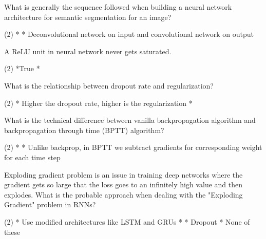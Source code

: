 \documentclass[10pt]{extarticle}
\begin{document}
\begin{exercise}
    What is generally the sequence followed when building a neural network architecture for semantic segmentation for an image?
    \begin{choice} (2)
        *
        * Deconvolutional network on input and convolutional network on output
    \end{choice}
\end{exercise}
\begin{solution}
\end{solution}

\begin{exercise}
    A ReLU unit in neural network never gets saturated.
    \begin{choice} (2)
        *True
        *
    \end{choice}
\end{exercise}
\begin{solution}
\end{solution}

\begin{exercise}
    What is the relationship between dropout rate and regularization?
    \begin{choice} (2)
        * Higher the dropout rate, higher is the regularization
        *
    \end{choice}
\end{exercise}
\begin{solution}
\end{solution}

\begin{exercise}
    What is the technical difference between vanilla backpropagation algorithm and backpropagation through time (BPTT) algorithm?
    \begin{choice} (2)
        *
        * Unlike backprop, in BPTT we subtract gradients for corresponding weight for each time step
    \end{choice}
\end{exercise}
\begin{solution}
\end{solution}

\begin{exercise}
    Exploding gradient problem is an issue in training deep networks where the gradient gets so large that the loss goes to an infinitely high value and then explodes.
    What is the probable approach when dealing with the "Exploding Gradient" problem in RNNs?
    \begin{choice} (2)
        * Use modified architectures like LSTM and GRUs
        *
        * Dropout
        * None of these
    \end{choice}
\end{exercise}
\begin{solution}
\end{solution}
\end{document}
